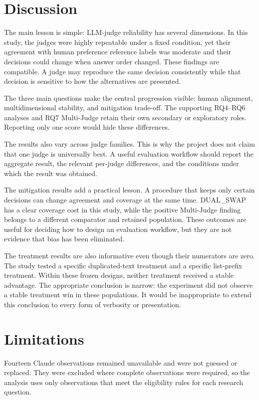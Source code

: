 \documentclass[11pt,a4paper]{article}
\begin{document}
\section{Discussion}

The main lesson is simple: LLM-judge reliability has several dimensions. In this study, the judges were highly repeatable under a fixed condition, yet their agreement with human preference reference labels was moderate and their decisions could change when answer order changed. These findings are compatible. A judge may reproduce the same decision consistently while that decision is sensitive to how the alternatives are presented.

The three main questions make the central progression visible: human alignment, multidimensional stability, and mitigation trade-off. The supporting RQ4--RQ6 analyses and RQ7 Multi-Judge retain their own secondary or exploratory roles. Reporting only one score would hide these differences.

The results also vary across judge families. This is why the project does not claim that one judge is universally best. A useful evaluation workflow should report the aggregate result, the relevant per-judge differences, and the conditions under which the result was obtained.

The mitigation results add a practical lesson. A procedure that keeps only certain decisions can change agreement and coverage at the same time. DUAL\_SWAP has a clear coverage cost in this study, while the positive Multi-Judge finding belongs to a different comparator and retained population. These outcomes are useful for deciding how to design an evaluation workflow, but they are not evidence that bias has been eliminated.

The treatment results are also informative even though their numerators are zero. The study tested a specific duplicated-text treatment and a specific list-prefix treatment. Within these frozen designs, neither treatment received a stable advantage. The appropriate conclusion is narrow: the experiment did not observe a stable treatment win in these populations. It would be inappropriate to extend this conclusion to every form of verbosity or presentation.

\section{Limitations}

Fourteen Claude observations remained unavailable and were not guessed or replaced. They were excluded where complete observations were required, so the analysis uses only observations that meet the eligibility rules for each research question.
\end{document}
